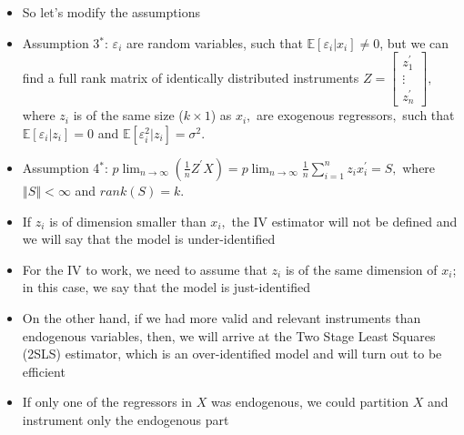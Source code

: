 \documentclass[notes=show]{beamer}
\begin{document}
\begin{frame}%


\begin{itemize}
\item So let's modify the assumptions

\item Assumption 3$^{\text{*}}$: $\varepsilon _{i}$ are random variables,
such that $\mathbb{E}[\varepsilon _{i}|x_{i}]\neq 0$, but we can find a full
rank matrix of identically distributed instruments $Z=\left[ 
\begin{array}{c}
z_{1}^{\prime } \\ 
\vdots \\ 
z_{n}^{\prime }%
\end{array}%
\right] ,$ where $z_{i}$ is of the same size ($k\times 1$) as $x_{i},$ are
exogenous regressors$,$ such that $\mathbb{E}[\varepsilon _{i}|z_{i}]=0$ and 
$\mathbb{E}[\varepsilon _{i}^{2}|z_{i}]=\sigma ^{2}.$

\item Assumption 4$^{\text{*}}$: $p\lim_{n\rightarrow \infty }(\frac{1}{n}%
Z^{\prime }X)=p\lim_{n\rightarrow \infty }\frac{1}{n}%
\sum_{i=1}^{n}z_{i}x_{i}^{\prime }=S,$ where $\left\Vert S\right\Vert
<\infty $ and $rank(S)=k.$
\end{itemize}

\end{frame}%

\begin{frame}%


\begin{itemize}
\item If $z_{i}$ is of dimension smaller than $x_{i},$ the IV estimator will
not be defined and we will say that the model is under-identified

\item For the IV to work, we need to assume that $z_{i}$ is of the same
dimension of $x_{i}$; in this case, we say that the model is just-identified

\item On the other hand, if we had more valid and relevant instruments than
endogenous variables, then, we will arrive at the Two Stage Least Squares
(2SLS) estimator, which is an over-identified model and will turn out to be
efficient

\item If only one of the regressors in $X$ was endogenous, we could
partition $X$ and instrument only the endogenous part
\end{itemize}

\end{frame}%
\end{document}
